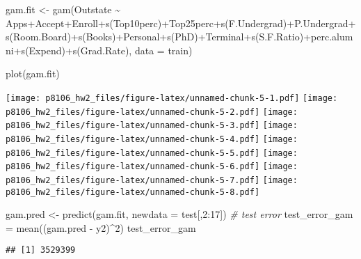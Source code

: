 \documentclass[
]{article}
\newenvironment{Shaded}{\begin{snugshade}}{\end{snugshade}}
\newcommand{\AttributeTok}[1]{\textcolor[rgb]{0.77,0.63,0.00}{#1}}
\newcommand{\CommentTok}[1]{\textcolor[rgb]{0.56,0.35,0.01}{\textit{#1}}}
\newcommand{\DecValTok}[1]{\textcolor[rgb]{0.00,0.00,0.81}{#1}}
\newcommand{\FunctionTok}[1]{\textcolor[rgb]{0.00,0.00,0.00}{#1}}
\newcommand{\NormalTok}[1]{#1}
\newcommand{\OtherTok}[1]{\textcolor[rgb]{0.56,0.35,0.01}{#1}}
\newcommand{\SpecialCharTok}[1]{\textcolor[rgb]{0.00,0.00,0.00}{#1}}
\begin{document}
\begin{Shaded}
\begin{Highlighting}[]
\NormalTok{gam.fit }\OtherTok{\textless{}{-}} \FunctionTok{gam}\NormalTok{(Outstate }\SpecialCharTok{\textasciitilde{}}\NormalTok{ Apps}\SpecialCharTok{+}\NormalTok{Accept}\SpecialCharTok{+}\NormalTok{Enroll}\SpecialCharTok{+}\FunctionTok{s}\NormalTok{(Top10perc)}\SpecialCharTok{+}\NormalTok{Top25perc}\SpecialCharTok{+}\FunctionTok{s}\NormalTok{(F.Undergrad)}\SpecialCharTok{+}\NormalTok{P.Undergrad}\SpecialCharTok{+}\FunctionTok{s}\NormalTok{(Room.Board)}\SpecialCharTok{+}\FunctionTok{s}\NormalTok{(Books)}\SpecialCharTok{+}\NormalTok{Personal}\SpecialCharTok{+}\FunctionTok{s}\NormalTok{(PhD)}\SpecialCharTok{+}\NormalTok{Terminal}\SpecialCharTok{+}\FunctionTok{s}\NormalTok{(S.F.Ratio)}\SpecialCharTok{+}\NormalTok{perc.alumni}\SpecialCharTok{+}\FunctionTok{s}\NormalTok{(Expend)}\SpecialCharTok{+}\FunctionTok{s}\NormalTok{(Grad.Rate), }\AttributeTok{data =}\NormalTok{ train)}

\FunctionTok{plot}\NormalTok{(gam.fit)}
\end{Highlighting}
\end{Shaded}

\texttt{[image: p8106\_hw2\_files/figure-latex/unnamed-chunk-5-1.pdf]}
\texttt{[image: p8106\_hw2\_files/figure-latex/unnamed-chunk-5-2.pdf]}
\texttt{[image: p8106\_hw2\_files/figure-latex/unnamed-chunk-5-3.pdf]}
\texttt{[image: p8106\_hw2\_files/figure-latex/unnamed-chunk-5-4.pdf]}
\texttt{[image: p8106\_hw2\_files/figure-latex/unnamed-chunk-5-5.pdf]}
\texttt{[image: p8106\_hw2\_files/figure-latex/unnamed-chunk-5-6.pdf]}
\texttt{[image: p8106\_hw2\_files/figure-latex/unnamed-chunk-5-7.pdf]}
\texttt{[image: p8106\_hw2\_files/figure-latex/unnamed-chunk-5-8.pdf]}

\begin{Shaded}
\begin{Highlighting}[]
\NormalTok{gam.pred }\OtherTok{\textless{}{-}} \FunctionTok{predict}\NormalTok{(gam.fit, }\AttributeTok{newdata =}\NormalTok{ test[,}\DecValTok{2}\SpecialCharTok{:}\DecValTok{17}\NormalTok{])}
\CommentTok{\# test error}
\NormalTok{test\_error\_gam }\OtherTok{=} \FunctionTok{mean}\NormalTok{((gam.pred }\SpecialCharTok{{-}}\NormalTok{ y2)}\SpecialCharTok{\^{}}\DecValTok{2}\NormalTok{)}
\NormalTok{test\_error\_gam}
\end{Highlighting}
\end{Shaded}

\begin{verbatim}
## [1] 3529399
\end{verbatim}
\end{document}
